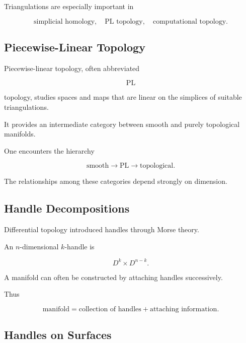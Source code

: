 Triangulations are especially important in

\[
\boxed{
\text{simplicial homology},
\quad
\text{PL topology},
\quad
\text{computational topology}.
}
\]

\subsection{Piecewise-Linear Topology}
\label{subsec:pl-topology}

Piecewise-linear topology, often abbreviated

\[
\boxed{
\mathrm{PL}
}
\]

topology, studies spaces and maps that are linear on the simplices of
suitable triangulations.

It provides an intermediate category between smooth and purely topological
manifolds.

One encounters the hierarchy

\[
\boxed{
\text{smooth}
\longrightarrow
\mathrm{PL}
\longrightarrow
\text{topological}.
}
\]

The relationships among these categories depend strongly on dimension.

\subsection{Handle Decompositions}
\label{subsec:handle-decompositions-geometric}

Differential topology introduced handles through Morse theory.

An \(n\)-dimensional \(k\)-handle is

\[
\boxed{
D^k\times D^{n-k}.
}
\]

A manifold can often be constructed by attaching handles successively.

Thus

\[
\boxed{
\text{manifold}
=
\text{collection of handles}
+
\text{attaching information}.
}
\]

\subsection{Handles on Surfaces}
\label{subsec:handles-on-surfaces}

